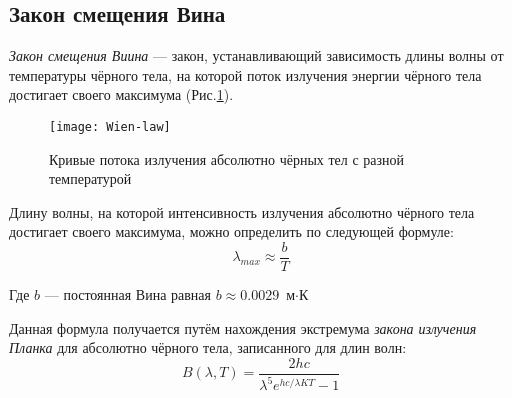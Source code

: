 \subsection{Закон смещения Вина}
\textit{Закон смещения Виина} --- закон, устанавливающий зависимость длины волны от температуры чёрного тела, на которой поток излучения энергии чёрного тела достигает своего максимума (Рис.\ref{pic:wien-law}).

\begin{figure}[h!]
\begin{center}
\texttt{[image: Wien-law]}
\end{center}
\caption{Кривые потока излучения абсолютно чёрных тел с разной температурой}\label{pic:wien-law}
\end{figure}

Длину волны, на которой интенсивность излучения абсолютно чёрного тела достигает своего максимума, можно определить по следующей формуле:
\begin{equation}
\lambda_{max}\approx\frac{b}{T}
\end{equation}

Где $b$ --- постоянная Вина равная $b\approx0.0029 $ $\text{м} \cdot \text{К}$

Данная формула получается путём нахождения экстремума \textit{закона излучения Планка} для абсолютно чёрного тела, записанного для длин волн:
\begin{equation}
B(\lambda,T)=\frac{2hc}{\lambda^5 e^{hc/\lambda KT}-1}
\end{equation}
